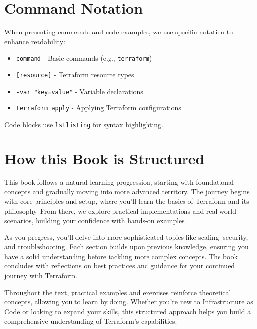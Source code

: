 \section*{Command Notation}

When presenting commands and code examples, we use specific notation to enhance readability:
\begin{itemize}
    \item \texttt{command} - Basic commands (e.g., \texttt{terraform})
    \item \texttt{[resource]} - Terraform resource types
    \item \texttt{-var "key=value"} - Variable declarations
    \item \texttt{terraform apply} - Applying Terraform configurations
\end{itemize}

Code blocks use \texttt{lstlisting} for syntax highlighting.

\section*{How this Book is Structured}

This book follows a natural learning progression, starting with foundational concepts and gradually moving into more advanced territory. The journey begins with core principles and setup, where you'll learn the basics of Terraform and its philosophy. From there, we explore practical implementations and real-world scenarios, building your confidence with hands-on examples.

As you progress, you'll delve into more sophisticated topics like scaling, security, and troubleshooting. Each section builds upon previous knowledge, ensuring you have a solid understanding before tackling more complex concepts. The book concludes with reflections on best practices and guidance for your continued journey with Terraform.

Throughout the text, practical examples and exercises reinforce theoretical concepts, allowing you to learn by doing. Whether you're new to Infrastructure as Code or looking to expand your skills, this structured approach helps you build a comprehensive understanding of Terraform's capabilities.

\clearpage
